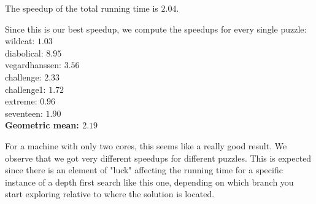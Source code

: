 \documentclass[a4paper]{article}
\begin{document}
The speedup of the total running time is $2.04$.

Since this is our best speedup, we compute the speedups for every single puzzle:\\
wildcat: $1.03$\\
diabolical: $8.95$\\
vegard\textunderscore hanssen: $3.56$\\
challenge: $2.33$\\
challenge1: $1.72$\\
extreme: $0.96$\\
seventeen: $1.90$\\
\textbf{Geometric mean: $2.19$}

For a machine with only two cores, this seems like a really good result. We observe that we got very different speedups for different puzzles. This is expected since there is an element of "luck" affecting the running time for a specific instance of a depth first search like this one, depending on which branch you start exploring relative to where the solution is located.
\end{document}
